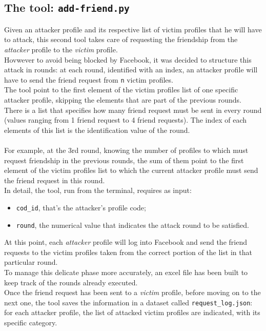 \subsection{The tool: \texttt{add-friend.py}}
Given an attacker profile and its respective list of victim profiles that he will have to attack, this second tool takes care of requesting the friendship from the \textit{attacker} profile to the \textit{victim} profile.\\
Hovwever to avoid being blocked by Facebook, it was decided to structure this attack in rounds: at each round, identified with an index, an attacker profile will have to send the friend request from \texttt{n} victim profiles.\\
The tool point to the first element of the victim profiles list of one specific attacker profile, skipping the elements that are part of the previous rounds.
\\There is a list that specifies how many friend request must be sent in every round (values ranging from 1 friend request to 4 friend requests). The index of each elements of this list is the identification value of the round.\\\\
For example, at the 3rd round, knowing the number of profiles to which must request friendship in the previous rounds, the sum of them point to the first element of the victim profiles list to which the current attacker profile must send the friend request in this round.
\\In detail, the tool, run from the terminal, requires as input:
\begin{itemize}
	\item \texttt{cod\_id}, that's the attacker's profile code;
	\item \texttt{round}, the numerical value that indicates the attack round to be satisfied.
\end{itemize}
At this point, each \textit{attacker} profile will log into Facebook and send the friend requests to the victim profiles taken from the correct portion of the list in that particular round. \\
To manage this delicate phase more accurately, an excel file has been built to keep track of the rounds already executed.
\\Once the friend request has been sent to a \textit{victim} profile, before moving on to the next one, the tool saves the information in a dataset called \texttt{request\_log.json}: for each attacker profile, the list of attacked victim profiles are indicated, with its specific category.